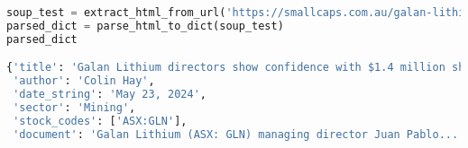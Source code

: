 \begin{lstlisting}[language=Python, caption={Example HTML extraction code use and dictionary response}, label={lst:html_extraction}]
soup_test = extract_html_from_url('https://smallcaps.com.au/galan-lithium-directors-show-confidence-share-purchase/')
parsed_dict = parse_html_to_dict(soup_test)
parsed_dict

{'title': 'Galan Lithium directors show confidence with $1.4 million share purchase',
 'author': 'Colin Hay',
 'date_string': 'May 23, 2024',
 'sector': 'Mining',
 'stock_codes': ['ASX:GLN'],
 'document': 'Galan Lithium (ASX: GLN) managing director Juan Pablo....}
\end{lstlisting}

